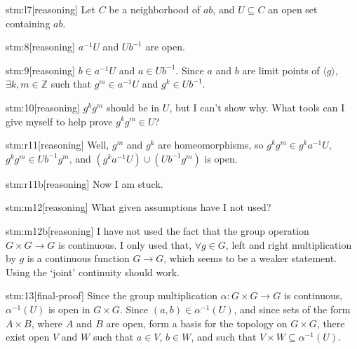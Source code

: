 \documentclass{article}
\begin{document}
\begin{stm}{stm:l7}[reasoning]
Let $C$ be a neighborhood of $ab$, and $U \subseteq C$ an open set containing $ab$.
\end{stm}

\begin{stm}{stm:8}[reasoning]
$a^{-1}U$ and $Ub^{-1}$ are open.
\end{stm}

\begin{stm}{stm:9}[reasoning]
$b \in a^{-1}U$ and $a \in Ub^{-1}$. Since $a$ and $b$ are limit points of ${\langle g \rangle}$, $\exists k, m \in \mathbb{Z}$ such that $g^m \in a^{-1}U$ and $g^k \in Ub^{-1}$.
\end{stm}

\begin{stm}{stm:10}[reasoning]
$g^k g^m$ should be in $U$, but I can't show why. What tools can I give myself to help prove $g^k g^m \in U$?
\end{stm}

\begin{stm}{stm:r11}[reasoning]
Well, $g^m$ and $g^k$ are homeomorphisms, so $g^k g^m \in g^k a^{-1}U$, $g^k g^m \in Ub^{-1} g^m$, and $(g^k a^{-1}U) \cup (Ub^{-1} g^m)$ is open.
\end{stm}

\begin{stm}{stm:r11b}[reasoning]
Now I am stuck.
\end{stm}

\begin{stm}{stm:m12}[reasoning]
What given assumptions have I not used? 
\end{stm}

\begin{stm}{stm:m12b}[reasoning]
I have not used the fact that the group operation $G \times G \to G$ is continuous. I only used that, $\forall g \in G$, left and right multiplication by $g$ is a continuous function $G \to G$, which seems to be a weaker statement. Using the ‘joint’ continuity should work.
\end{stm}

\begin{stm}{stm:13}[final-proof]
Since the group multiplication $\alpha: G \times G \to G$ is continuous, $\alpha^{-1}(U)$ is open in $G \times G$. Since $(a,b) \in \alpha^{-1}(U)$, and since sets of the form $A \times B$, where $A$ and $B$ are open, form a basis for the topology on $G \times G$, there exist open $V$ and $W$ such that $a \in V$, $b \in W$, and such that $V \times W \subseteq \alpha^{-1}(U)$.
\end{stm}
\end{document}
